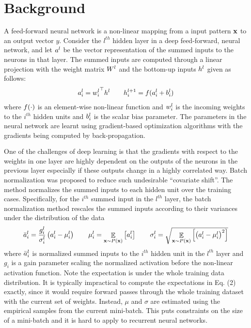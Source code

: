 \documentclass{article}
\begin{document}
\section{Background}
\label{sec:model}

A feed-forward neural network is a non-linear mapping from a input pattern ${\bold x}$ to an output vector $y$. Consider the $l^{th}$ hidden layer in a deep feed-forward, neural network, and let ${a}^l$ be the vector representation of the summed inputs to the neurons in that layer. The summed inputs are computed through a linear projection with the weight matrix ${W}^l$ and the bottom-up inputs ${h}^l$ given as follows:
\begin{equation}
{a}^l_i = {{w}^l_i}^\top {h}^l
\qquad
{h}^{l+1}_i = {f}({a}^l_i + {b}^l_i)
\end{equation}
where ${f}(\cdot)$ is an element-wise non-linear function and ${w}^l_i$ is the incoming weights to the $i^{th}$ hidden units and ${b}^l_i$ is the scalar bias parameter. The parameters in the neural network are learnt using gradient-based optimization algorithms with the gradients being computed by back-propagation. 

One of the challenges of deep learning is that the gradients with respect to the weights in one layer are highly dependent on the outputs of the neurons in the previous layer especially if these outputs change in a highly correlated way. 
Batch normalization \citep{ioffe2015batch} was proposed to reduce such undesirable ``covariate shift''. The method normalizes the summed inputs to each hidden unit over the training cases.  Specifically, for the $i^{th}$ summed input in the $l^{th}$ layer, the batch normalization method rescales the summed inputs according to their variances under the distribution of the  data
\begin{equation}
\bar{{a}}^l_i = {{g}^l_i\over\sigma^l_i}\left({a}^l_i - \mu^l_i \right)
\qquad
\mu^l_i = \mathop{\mathbb{E}}_{{\bold x} \sim P({\bold x})} \left[ {a}^l_i \right]
\qquad
\sigma^l_i = \sqrt{\mathop{\mathbb{E}}_{{\bold x} \sim P({\bold x})} \left[\left( {a}^l_i  - \mu^l_i \right)^2\right]}
\label{eq:bn}
\end{equation}
where $\bar{{a}}^l_i$ is normalized summed inputs to the $i^{th}$ hidden unit in the $l^{th}$ layer and $g_i$ is a gain parameter scaling the normalized activation before the non-linear activation function. Note the expectation is under the whole training data distribution.  It is typically impractical to compute the expectations in Eq. (2) exactly, since it would require forward passes through the whole training dataset with the current set of weights.  Instead, $\mu$ and $\sigma$ are estimated using the empirical samples from the current mini-batch. This puts constraints on the size of a mini-batch and it is hard to apply to recurrent neural networks.
\end{document}
